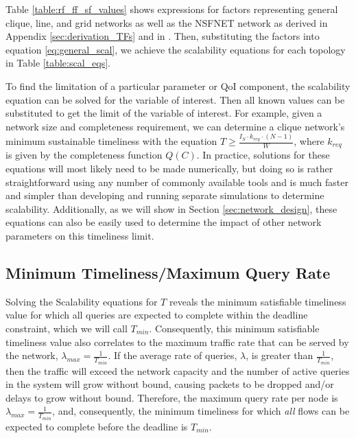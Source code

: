 Table \ref{table:rf_ff_sf_values} shows expressions for factors representing general clique, line, and grid networks as well as the NSFNET network as derived in Appendix \ref{sec:derivation_TFs} and in \cite{symptotics_journal}. Then, substituting the factors into equation \ref{eq:general_scal}, we achieve the scalability equations for each topology in Table \ref{table:scal_eqs}.  


To find the limitation of a particular parameter or QoI component, the scalability equation can be solved for the variable of interest.  Then all known values can be substituted to get the limit of the variable of interest.  For example, given a network size and completeness requirement, we can determine a clique network's minimum sustainable timeliness with the equation $T  \geq \frac{I_S \cdot k_{req} \cdot (N-1)}{W}$, where $k_{req}$ is given by the completeness function $Q(C)$.  In practice, solutions for these equations will most likely need to be made numerically, but doing so is rather straightforward using any number of commonly available tools and is much faster and simpler than developing and running separate simulations to determine scalability.  Additionally, as we will show in Section \ref{sec:network_design}, these equations can also be easily used to determine the impact of other network parameters on this timeliness limit. 

\subsection{Minimum Timeliness/Maximum Query Rate}

Solving the Scalability equations for $T$ reveals the minimum satisfiable timeliness value for which all queries are expected to complete within the deadline constraint, which we will call $T_{min}$.  Consequently, this minimum satisfiable timeliness value also correlates to the maximum traffic rate that can be served by the network, $\lambda_{max} = \frac{1}{T_{min}}$.  If the average rate of queries, $\lambda$, is greater than $\frac{1}{T_{min}}$, then the traffic will exceed the network capacity and the number of active queries in the system will grow without bound, causing packets to be dropped and/or delays to grow without bound.  Therefore, the maximum query rate per node is $\lambda_{max} = \frac{1}{T_{min}}$, and, consequently, the minimum timeliness for which \emph{all} flows can be expected to complete before the deadline is $T_{min}$.


